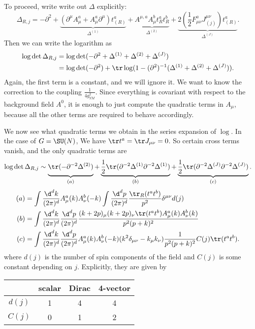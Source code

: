 \documentclass[a4paper]{article}
\begin{document}
To proceed, write write out $\Delta$ explicitly:
\[
  \Delta_{R, j} = - \partial^2 + \underbrace{(\partial^\mu A_\mu^a + A_\mu^a \partial^\mu) t^a_{(R)}}_{\Delta^{(1)}} + \underbrace{A^{\mu, a} A_\mu^b t^a_R t^b_R}_{\Delta^{(2)}} + \underbrace{2 \left(\frac{1}{2} F^a_{\mu\nu} J^{\mu\nu}_{(j)}\right) t^a_{(R)}}_{\Delta^{(J)}}.
\]
Then we can write the logarithm as
\begin{align*}
  \log \det \Delta_{R, j} &= \log \det (- \partial^2 + \Delta^{(1)} + \Delta^{(2)} + \Delta^{(J)})\\
  &= \log \det (- \partial^2) + \tr \log (1 - (\partial^2)^{-1} (\Delta^{(1)} + \Delta^{(2)} + \Delta^{(J)})).
\end{align*}
Again, the first term is a constant, and we will ignore it. We want to know the correction to the coupling $\frac{1}{4 g_{YM}^2}$. Since everything is covariant with respect to the background field $A^0$, it is enough to just compute the quadratic terms in $A_\mu$, because all the other terms are required to behave accordingly.

We now see what quadratic terms we obtain in the series expansion of $\log$. In the case of $G = \SU(N)$, We have $\tr t^a = \tr J_{\mu\nu} = 0$. So certain cross terms vanish, and the only quadratic terms are
\[
  \log \det \Delta_{R, j} \sim \underbrace{\vphantom{\frac{1}{2}}\tr (- \partial^{-2} \Delta^{(2)})}_{(a)} + \underbrace{\frac{1}{2} \tr (\partial^{-2} \Delta^{(1)} \partial^{-2} \Delta^{(1)})}_{(b)} + \underbrace{\frac{1}{2} \tr (\partial^{-2} \Delta^{(J)} \partial^{-2} \Delta^{(J)})}_{(c)}.
\]
\begin{align*}
  (a) &= \int \frac{\d^d k}{(2\pi)^d} A_\mu^a(k) A_\nu^b(-k) \int \frac{\d^d p}{(2\pi)^d} \frac{\tr_R(t^a t^b)}{p^2} \delta^{\mu\nu} d(j)\\
  (b) &= \int \frac{\d^d k}{(2\pi)^d} \frac{\d^d p}{(2\pi)^d} \frac{(k + 2p)_\mu (k + 2p)_\nu\tr(t^a t^b) A_\mu^a(k) A_\nu^b(k)}{p^2 (p + k)^2}\\
  (c) &= \int \frac{\d^d k}{(2\pi)^d} \frac{\d^d p}{(2\pi)^d} A_\mu^a(k) A_\nu^b(-k) (k^2 \delta_{\mu\nu} - k_\mu k_\nu) \frac{1}{p^2(p + k)^2} C(j) \tr (t^a t^b).
\end{align*}
where $d(j)$ is the number of spin components of the field and $C(j)$ is some constant depending on $j$. Explicitly, they are given by
\begin{center}
  \begin{tabular}{cccc}
    \toprule
    & scalar & Dirac & 4-vector\\
    \midrule
    $d(j)$ & 1 & 4 & 4\\
    $C(j)$ & 0 & 1 & 2\\
    \bottomrule
  \end{tabular}
\end{center}
\end{document}
